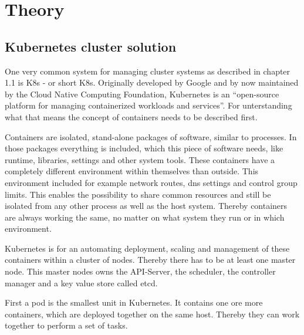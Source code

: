 \chapter{Theory}

\section{Kubernetes cluster solution}

One very common system for managing cluster systems as described in chapter 1.1 is \acl{K8s} - or short \acs{K8s}. Originally developed by Google and by now maintained by the Cloud Native Computing Foundation, Kubernetes is an ``open-source platform for managing containerized workloads and services''. For unterstanding what that means the concept of containers needs to be described first.


Containers are isolated, stand-alone packages of software, similar to processes. In those packages everything is included, which this piece of software needs, like runtime, libraries, settings and other system tools.  These containers have a completely different environment within themselves than outside. This environment included for example network routes, dns settings and control group limits. This enables the possibility to share common resources and still be isolated from any other process as well as the host system. Thereby containers are always working the same, no matter on what system they run or in which environment.



Kubernetes is for an automating deployment, scaling and management of these containers within a cluster of nodes. Thereby there has to be at least one master node. This master nodes owns the API-Server, the scheduler, the controller manager and a key value store called etcd. 

First a pod is the smallest unit in Kubernetes. It contains one ore more containers, which are deployed together on the same host. Thereby they can work together to perform a set of tasks.%


